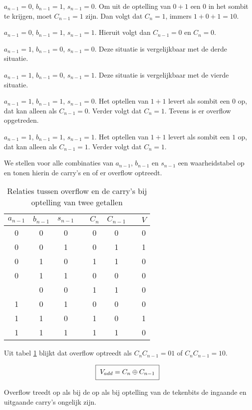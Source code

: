 \documentclass[a4paper,12pt,oneside]{article}
\theoremstyle{own}
\begin{document}
$a_{n-1}=0$, $b_{n-1}=1$, $s_{n-1}=0$. Om uit de optelling van $0+1$ een
$0$ in het sombit te krijgen, moet $C_{n-1} = 1$ zijn. Dan volgt dat
$C_n = 1$, immers $1+0+1=10$.

$a_{n-1}=0$, $b_{n-1}=1$, $s_{n-1}=1$. Hieruit volgt dan $C_{n-1} = 0$ en
$C_n = 0$.

$a_{n-1}=1$, $b_{n-1}=0$, $s_{n-1}=0$. Deze situatie is vergelijkbaar met
de derde situatie.

$a_{n-1}=1$, $b_{n-1}=0$, $s_{n-1}=1$. Deze situatie is vergelijkbaar met
de vierde situatie.

$a_{n-1}=1$, $b_{n-1}=1$, $s_{n-1}=0$. Het optellen van $1+1$ levert als
sombit een $0$ op, dat kan alleen als $C_{n-1} = 0$. Verder volgt dat 
$C_n = 1$. Tevens is er overflow opgetreden.

$a_{n-1}=1$, $b_{n-1}=1$, $s_{n-1}=1$. Het optellen van $1+1$ levert als
sombit een $1$ op, dat kan alleen als $C_{n-1} = 1$. Verder volgt dat 
$C_n = 1$.


We stellen voor alle combinaties van $a_{n-1}$, $b_{n-1}$ en $s_{n-1}$ een
waarheidstabel op en tonen hierin de carry's en of er overflow optreedt.

\begin{table}[ht!]
	\centering
	\caption{Relaties tussen overflow en de carry's bij optelling van twee getallen}
	\label{tab:ovdetadd}
	\begin{tabular}{cccccccc}
	\toprule
	$a_{n-1}$ & $b_{n-1}$ & $s_{n-1}$ & & $C_n$ & $C_{n-1}$ & & $V$ \\ \midrule
	  0   &   0   &   0   & &   0   &   0   & &  0  \\
	  0   &   0   &   1   & &   0   &   1   & &  1  \\
	  0   &   1   &   0   & &   1   &   1   & &  0  \\
	  0   &   1   &   1   & &   0   &   0   & &  0  \\ \addlinespace[0.75ex]
	  1   &   0   &   0   & &   1   &   1   & &  0  \\
	  1   &   0   &   1   & &   0   &   0   & &  0  \\
	  1   &   1   &   0   & &   1   &   0   & &  1  \\
	  1   &   1   &   1   & &   1   &   1   & &  0  \\ \bottomrule
	\end{tabular}
\end{table}

Uit tabel \ref{tab:ovdetadd} blijkt dat overflow optreedt als $C_nC_{n-1} = 01$
 of $C_nC_{n-1} = 10$.

\begin{equation}
\setlength{\fboxsep}{6pt}
\label{eqn:overflowcncn1}
\boxed{V_{add} = C_n \oplus C_{n-1}}
\end{equation}

Overflow treedt op als bij de op als bij optelling van de tekenbits de ingaande
en uitgaande carry's ongelijk zijn.
\end{document}
